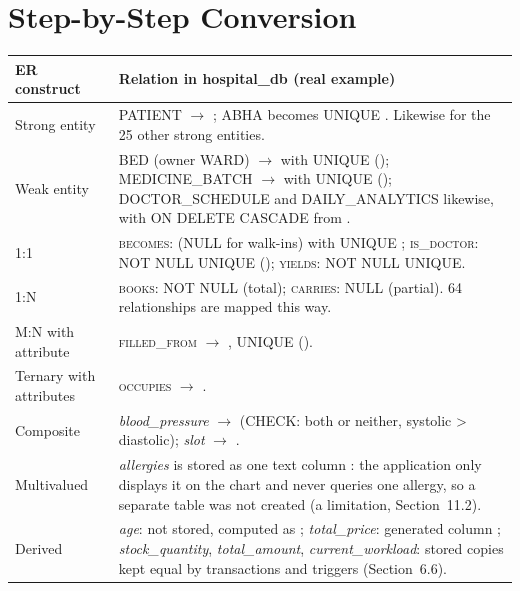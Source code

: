 \section{Step-by-Step Conversion}
\begin{tabularx}{\textwidth}{@{}R{3.1cm}Y@{}}
\toprule
\textbf{ER construct} & \textbf{Relation in hospital\_db (real example)} \\\midrule
Strong entity & PATIENT $\to$ ; ABHA becomes UNIQUE . Likewise for the 25 other strong entities. \\
Weak entity & BED (owner WARD) $\to$  with UNIQUE (); MEDICINE\_BATCH $\to$  with UNIQUE (); DOCTOR\_SCHEDULE and DAILY\_ANALYTICS likewise, with ON DELETE CASCADE from . \\
1:1 & \textsc{becomes}:  (NULL for walk-ins) with UNIQUE ; \textsc{is\_doctor}:  NOT NULL UNIQUE (); \textsc{yields}:  NOT NULL UNIQUE. \\
1:N & \textsc{books}:  NOT NULL (total); \textsc{carries}:  NULL (partial). 64 relationships are mapped this way. \\
M:N with attribute & \textsc{filled\_from} $\to$ , UNIQUE (). \\
Ternary with attributes & \textsc{occupies} $\to$ . \\
Composite & \emph{blood\_pressure} $\to$  (CHECK: both or neither, systolic > diastolic); \emph{slot} $\to$ . \\
Multivalued & \emph{allergies} is stored as one text column : the application only displays it on the chart and never queries one allergy, so a separate  table was not created (a limitation, Section~11.2). \\
Derived & \emph{age}: not stored, computed as ; \emph{total\_price}: generated column ; \emph{stock\_quantity}, \emph{total\_amount}, \emph{current\_workload}: stored copies kept equal by transactions and triggers (Section~6.6). \\
\bottomrule
\end{tabularx}

